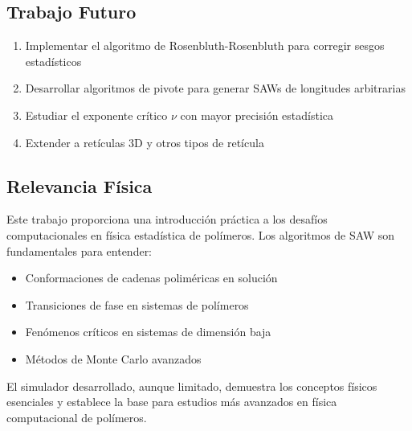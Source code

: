 \documentclass[11pt,a4paper]{article}
\begin{document}
\subsection{Trabajo Futuro}
\begin{enumerate}
    \item Implementar el algoritmo de Rosenbluth-Rosenbluth para corregir sesgos estadísticos
    \item Desarrollar algoritmos de pivote para generar SAWs de longitudes arbitrarias
    \item Estudiar el exponente crítico $\nu$ con mayor precisión estadística
    \item Extender a retículas 3D y otros tipos de retícula
\end{enumerate}

\subsection{Relevancia Física}
Este trabajo proporciona una introducción práctica a los desafíos computacionales en física estadística de polímeros. Los algoritmos de SAW son fundamentales para entender:
\begin{itemize}
    \item Conformaciones de cadenas poliméricas en solución
    \item Transiciones de fase en sistemas de polímeros
    \item Fenómenos críticos en sistemas de dimensión baja
    \item Métodos de Monte Carlo avanzados
\end{itemize}

El simulador desarrollado, aunque limitado, demuestra los conceptos físicos esenciales y establece la base para estudios más avanzados en física computacional de polímeros.
\end{document}
